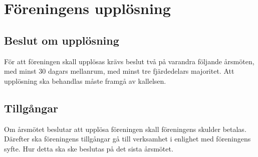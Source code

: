 \section{Föreningens upplösning}

\subsection{Beslut om upplösning}
För att föreningen skall upplösas krävs beslut två på varandra följande årsmöten, med
minst 30 dagars mellanrum, med minst tre fjärdedelars majoritet. Att upplösning ska
behandlas måste framgå av kallelsen.
\subsection{Tillgångar}
Om årsmötet beslutar att upplösa föreningen skall föreningens skulder betalas.
Därefter ska föreningens tillgångar gå till verksamhet i enlighet med föreningens
syfte. Hur detta ska ske beslutas på det sista årsmötet.